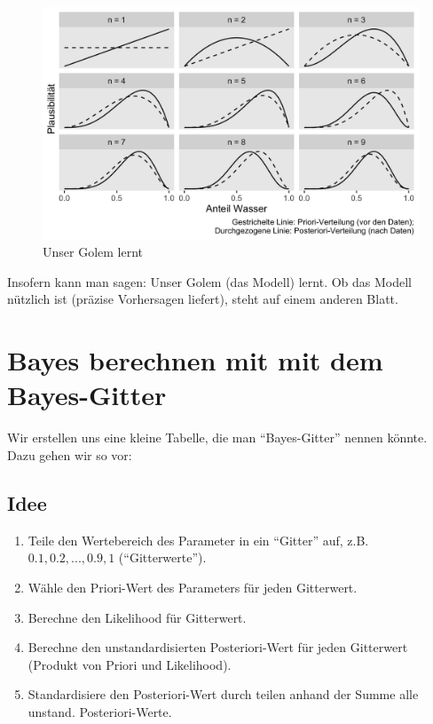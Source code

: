 \documentclass[
  a4paper,
  DIV=11]{scrreprt}
\providecommand{\tightlist}{%
  \setlength{\itemsep}{0pt}\setlength{\parskip}{0pt}}\usepackage{longtable,booktabs,array}
\theoremstyle{definition}
\theoremstyle{remark}
\begin{document}
\begin{figure}

{\centering \includegraphics{./img/img221.png}

}

\caption{\label{fig-lernen-golem}Unser Golem lernt}

\end{figure}

Insofern kann man sagen: Unser Golem (das Modell) lernt. Ob das Modell
nützlich ist (präzise Vorhersagen liefert), steht auf einem anderen
Blatt.

\hypertarget{bayes-berechnen-mit-mit-dem-bayes-gitter}{%
\section{Bayes berechnen mit mit dem
Bayes-Gitter}\label{bayes-berechnen-mit-mit-dem-bayes-gitter}}

Wir erstellen uns eine kleine Tabelle, die man ``Bayes-Gitter'' nennen
könnte. Dazu gehen wir so vor:

\hypertarget{idee}{%
\subsection{Idee}\label{idee}}

\begin{enumerate}
\def\labelenumi{\arabic{enumi}.}
\tightlist
\item
  Teile den Wertebereich des Parameter in ein ``Gitter'' auf, z.B.
  \(0.1, 0.2, ..., 0.9, 1\) (``Gitterwerte'').
\item
  Wähle den Priori-Wert des Parameters für jeden Gitterwert.
\item
  Berechne den Likelihood für Gitterwert.
\item
  Berechne den unstandardisierten Posteriori-Wert für jeden Gitterwert
  (Produkt von Priori und Likelihood).
\item
  Standardisiere den Posteriori-Wert durch teilen anhand der Summe alle
  unstand. Posteriori-Werte.
\end{enumerate}
\end{document}
